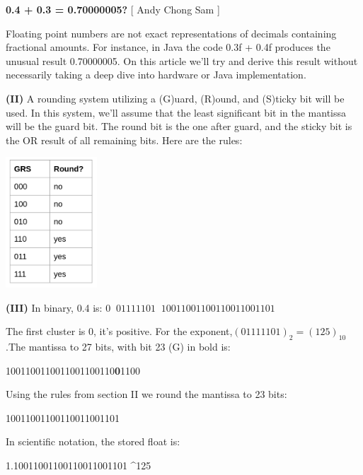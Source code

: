 \documentclass[12pt]{article}
\begin{document}
	
	\begin{center}
		\par\noindent \large \textbf{0.4 + 0.3 = 0.70000005?}  [ Andy Chong Sam ]
	\end{center}
	\begin{minipage}[t]{.5\linewidth}
		\par\noindent Floating point numbers are not exact representations of decimals  containing fractional amounts. For instance, in Java the code 0.3f + 0.4f produces the unusual result 0.70000005. On this article we'll try and derive this  result without necessarily taking a deep dive into hardware or Java implementation.
		\newline
		\par\noindent \textbf{(II)} A rounding system utilizing a (G)uard, (R)ound, and (S)ticky bit will be used. In this system, we'll assume that the least significant bit in the mantissa will be the guard bit. The round bit is the one after guard, and the sticky bit is the OR result of all remaining bits. Here are the rules:
		
		\begin{center}
			\includegraphics[width=3.4cm]{case-1.png}
		\end{center}
	
		\par\noindent \textbf{(III)} In binary, 0.4 is: \newline
		\(0\;\;01111101\;\;10011001100110011001101\) \newline
		\par\noindent The first cluster is 0, it's positive. For the exponent,\((01111101)_2 = (125)_{10}\).The mantissa to 27 bits, with bit 23 (G) in bold is:
		\begin{flalign*}
			1001100110011001100110\textbf{0}1100
		\end{flalign*}
		\par\noindent Using the rules from section II we round the mantissa to 23 bits:
		\begin{flalign*}
			10011001100110011001101
		\end{flalign*}
		\par\noindent In scientific notation, the stored float is:
		\begin{flalign*}
			1.10011001100110011001101 ^{125}
		\end{flalign*}
	\end{minipage}	
\end{document}
